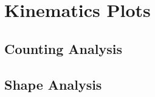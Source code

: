 
\section{Kinematics Plots}

\subsection{Counting Analysis}

\FloatBarrier



\subsection{Shape Analysis}

\FloatBarrier

\FloatBarrier

\FloatBarrier

\FloatBarrier

\FloatBarrier

\FloatBarrier

\FloatBarrier
